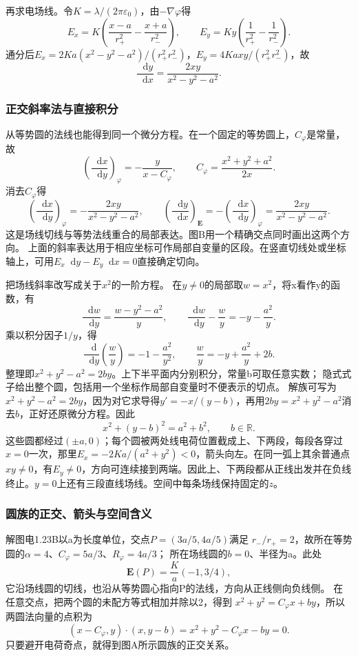 \documentclass[UTF8,fontset=fandol,a4paper,11pt]{ctexart}
\newcommand{\dd}{\mathop{}\!\mathrm{d}}
\newcommand{\result}[1]{\begin{equation*}\boxed{#1}\end{equation*}}
\begin{document}
再求电场线。令$K=\lambda/(2\pi\varepsilon_0)$，由$-\nabla\varphi$得
\[E_x=K\left(\frac{x-a}{r_+^2}-\frac{x+a}{r_-^2}\right),\qquad
E_y=Ky\left(\frac1{r_+^2}-\frac1{r_-^2}\right).
\]
通分后$E_x=2Ka(x^2-y^2-a^2)/(r_+^2r_-^2)$，$E_y=4Kaxy/(r_+^2r_-^2)$，故
\[\frac{\dd y}{\dd x}=\frac{2xy}{x^2-y^2-a^2}.
\]
\subsubsection*{正交斜率法与直接积分}
从等势圆的法线也能得到同一个微分方程。在一个固定的等势圆上，$C_\varphi$是常量，故
\[
\left(\frac{\dd x}{\dd y}\right)_\varphi
=-\frac{y}{x-C_\varphi},\qquad
C_\varphi=\frac{x^2+y^2+a^2}{2x}.
\]
消去$C_\varphi$得
\[
\left(\frac{\dd x}{\dd y}\right)_\varphi
=-\frac{2xy}{x^2-y^2-a^2},\qquad
\left(\frac{\dd y}{\dd x}\right)_{\boldsymbol E}
=-\left(\frac{\dd x}{\dd y}\right)_\varphi
=\frac{2xy}{x^2-y^2-a^2}.
\]
这是场线切线与等势法线重合的局部表达。图B用一个精确交点同时画出这两个方向。
上面的斜率表达用于相应坐标可作局部自变量的区段。在竖直切线处或坐标轴上，可用$E_x\dd y-E_y\dd x=0$直接确定切向。

把场线斜率改写成关于$x^2$的一阶方程。
在$y\ne0$的局部取$w=x^2$，将x看作y的函数，有
\[
\frac{\dd w}{\dd y}=\frac{w-y^2-a^2}{y},\qquad
\frac{\dd w}{\dd y}-\frac wy=-y-\frac{a^2}{y}.
\]
乘以积分因子$1/y$，得
\[
\frac{\dd}{\dd y}\left(\frac wy\right)=-1-\frac{a^2}{y^2},\qquad
\frac wy=-y+\frac{a^2}{y}+2b.
\]
整理即$x^2+y^2-a^2=2by$。上下半平面内分别积分，常量b可取任意实数；
隐式式子给出整个圆，包括用一个坐标作局部自变量时不便表示的切点。
解族可写为$x^2+y^2-a^2=2by$，因为对它求导得$y'=-x/(y-b)$，再用$2by=x^2+y^2-a^2$消去$b$，正好还原微分方程。因此
\result{x^2+(y-b)^2=a^2+b^2,\qquad b\in\mathbb R.}
这些圆都经过$(\pm a,0)$；每个圆被两处线电荷位置截成上、下两段，每段各穿过$x=0$一次，那里$E_x=-2Ka/(a^2+y^2)<0$，箭头向左。在同一弧上其余普通点$xy\ne0$，有$E_y\ne0$，方向可连续接到两端。因此上、下两段都从正线出发并在负线终止。$y=0$上还有三段直线场线。空间中每条场线保持固定的$z$。

\subsubsection*{圆族的正交、箭头与空间含义}
解图电1.23B以a为长度单位，交点$P=(3a/5,4a/5)$满足
$r_-/r_+=2$，故所在等势圆的$\alpha=4$、$C_\varphi=5a/3$、$R_\varphi=4a/3$；
所在场线圆的$b=0$、半径为a。此处
\[
\boldsymbol E(P)=\frac Ka(-1,3/4),
\]
它沿场线圆的切线，也沿从等势圆心指向P的法线，方向从正线侧向负线侧。
在任意交点，把两个圆的未配方等式相加并除以2，得到
$x^2+y^2=C_\varphi x+by$，所以两圆法向量的点积为
\[
(x-C_\varphi,y)\cdot(x,y-b)
=x^2+y^2-C_\varphi x-by=0.
\]
只要避开电荷奇点，就得到图A所示圆族的正交关系。
\end{document}
